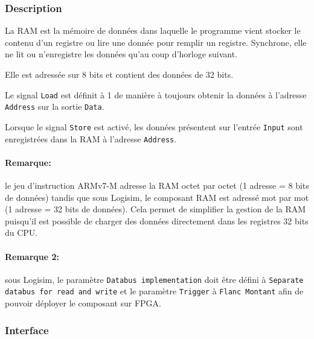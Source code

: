 \documentclass{article}
\begin{document}
    \subsubsection{Description}

    La RAM est la mémoire de données dans laquelle le programme vient stocker le contenu d'un registre ou lire une donnée pour remplir un registre.
    Synchrone, elle ne lit ou n'enregistre les données qu'au coup d'horloge suivant.

    Elle est adressée sur 8 bits et contient des données de 32 bits.

    Le signal \texttt{Load} est définit à 1 de manière à toujours obtenir la données à l'adresse \texttt{Address} sur la sortie \texttt{Data}.

    Lorsque le signal \texttt{Store} est activé, les données présentent sur l'entrée \texttt{Input} sont enregistrées dans la RAM à l'adresse \texttt{Address}.

    \paragraph{Remarque:} le jeu d'instruction ARMv7-M adresse la RAM octet par octet (1 adresse = 8 bits de données) tandis que sous Logisim, le composant RAM est adressé mot par mot (1 adresse = 32 bits de données).
    Cela permet de simplifier la gestion de la RAM puisqu'il est possible de charger des données directement dans les registres 32 bits du CPU.

    \paragraph{Remarque 2:} sous Logisim, le paramètre \texttt{Databus implementation} doit être défini à \texttt{Separate databus for read and write}
    et le paramètre \texttt{Trigger} à \texttt{Flanc Montant} afin de pouvoir déployer le composant sur FPGA.

    \subsubsection{Interface}

\end{document}
